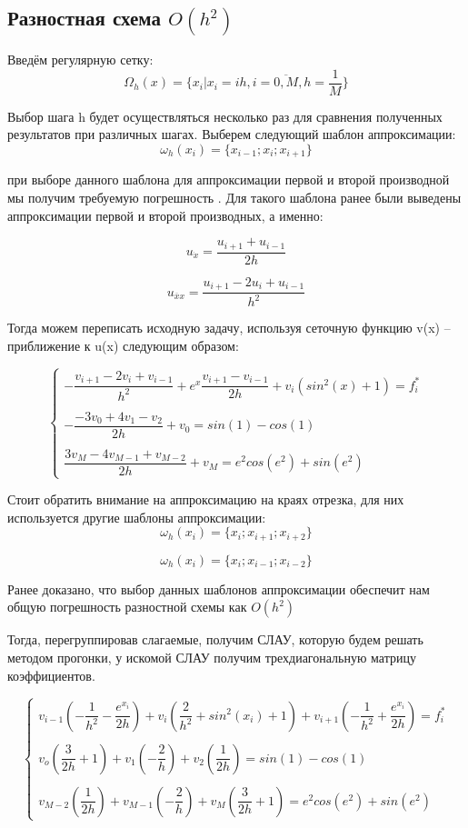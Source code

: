 \documentclass[12pt]{article}
\begin{document}
\subsection{Разностная схема $O(h^2)$}
Введём регулярную сетку:
$$
\Omega_h(x) = \{x_i | x_i = ih, i = \overline{0, M}, h = \dfrac{1}{M}\}
$$

Выбор шага h будет осуществляться несколько раз для сравнения полученных результатов при различных шагах.
Выберем следующий шаблон аппроксимации:
$$
\omega_h(x_i) = \{ x_{i-1}; x_i; x_{i + 1}\}
$$

при выборе данного шаблона для аппроксимации первой и второй производной  мы получим требуемую погрешность . Для такого шаблона ранее были выведены аппроксимации первой и второй производных, а именно:

$$
u_{\dot{x}} = \dfrac{u_{i + 1} + u_{i - 1}}{2h}
$$

$$
u_{\overline{x}x} = \dfrac{u_{i + 1} -2u_i+ u_{i - 1}}{h^2}
$$

Тогда можем переписать исходную задачу, используя сеточную функцию v(x) – приближение к u(x) следующим образом:

$$
\begin{cases}
-\dfrac{v_{i+1} - 2v_i + v_{i-1}}{h^2} + e^x\dfrac{v_{i+1} - v_{i-1}}{2h} + v_i(sin^2(x) + 1) = f_i^* \\
\\
- \dfrac{-3v_0 + 4v_1 - v_2}{2h} + v_0 = sin(1) - cos(1) \\
\\
\dfrac{3v_M - 4v_{M-1} + v_{M-2}}{2h} + v_M = e^2cos(e^2) + sin(e^2)
\end{cases}
$$

Стоит обратить внимание на аппроксимацию на краях отрезка, для них используется другие шаблоны аппроксимации:
$$
\omega_h(x_i) = \{ x_{i}; x_{i + 1}; x_{i + 2}\}
$$

$$
\omega_h(x_i) = \{ x_i; x_{i - 1}; x_{i - 2}\}
$$

Ранее доказано, что выбор данных шаблонов аппроксимации обеспечит нам общую погрешность разностной схемы как 
$O(h^2)$

Тогда, перегруппировав слагаемые, получим СЛАУ, которую будем решать методом прогонки, у искомой СЛАУ получим трехдиагональную матрицу коэффициентов.

$$
\begin{cases}
v_{i-1}(-\dfrac{1}{h^2} - \dfrac{e^{x_i}}{2h}) + v_i(\dfrac{2}{h^2} + sin^2(x_i) + 1) + v_{i + 1}(-\dfrac{1}{h^2} + \dfrac{e^{x_i}}{2h}) = f_i^*\\
\\
v_o(\dfrac{3}{2h}  +1) + v_1(-\dfrac{2}{h}) + v_2(\dfrac{1}{2h}) = sin(1) - cos(1)\\
\\
v_{M-2}(\dfrac{1}{2h}) + v_{M-1}(-\dfrac{2}{h})  +v_M(\dfrac{3}{2h} + 1) = e^2cos(e^2) + sin(e^2)
\end{cases}
$$
\end{document}
